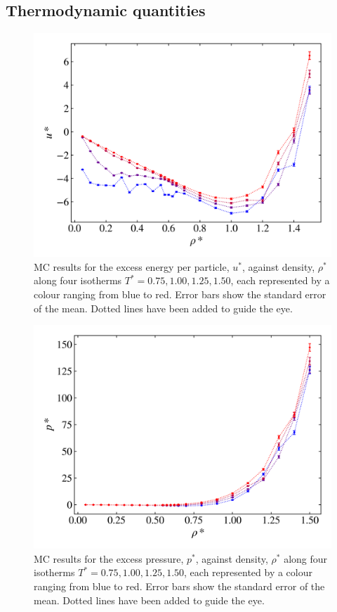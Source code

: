 \documentclass[10pt, twocolumn]{revtex4}    %
\begin{document}
\subsection{Thermodynamic quantities} \label{ss:thermodynamics}
\begin{figure}
	\includegraphics[width=\linewidth]{figures/excessEnergyPressure/excessEnergy.png}
	\caption{MC results for the excess energy per particle, $u^{*}$, against density, $\rho{}^{*}$ along four isotherms $T^{*}=0.75, 1.00, 1.25, 1.50$, each represented by a colour ranging from blue to red. Error bars show the standard error of the mean. Dotted lines have been added to guide the eye.}
	\label{fig:excessEnergy}
\end{figure}
	
\begin{figure}
	\includegraphics[width=\linewidth]{figures/excessEnergyPressure/excessPressure.png}
	\caption{MC results for the excess pressure, $p^{*}$, against density, $\rho{}^{*}$ along four isotherms $T^{*}=0.75, 1.00, 1.25, 1.50$, each represented by a colour ranging from blue to red. Error bars show the standard error of the mean. Dotted lines have been added to guide the eye.}
	\label{fig:excessPressure}
\end{figure}
\end{document}
